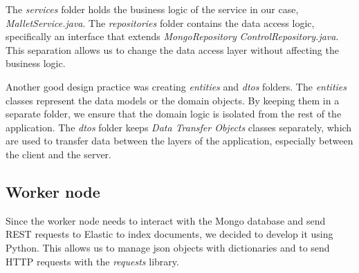 The \textit{services} folder holds the business logic of the service in our case, \textit{MalletService.java}. The
\textit{repositories} folder contains the data access logic, specifically an interface that extends
\textit{MongoRepository} \textit{ControlRepository.java}. This separation allows us to change the data access layer
without affecting the business logic.

Another good design practice was creating \textit{entities} and \textit{dtos} folders. The \textit{entities} classes
represent the data models or the domain objects. By keeping them in a separate folder, we ensure that the domain logic
is isolated from the rest of the application. The \textit{dtos} folder keeps \textit{Data Transfer Objects} classes
separately, which are used to transfer data between the layers of the application, especially between the client and the server.

\subsection{Worker node}
Since the worker node needs to interact with the Mongo database and send REST requests
to Elastic to index documents, we decided to develop it using Python.
This allows us to manage json objects with dictionaries and to send HTTP requests
with the \textit{requests} library.
